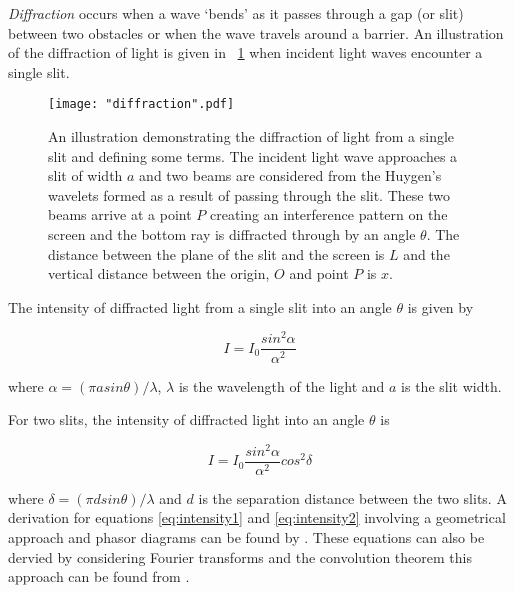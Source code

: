 \documentclass{article}
\newcommand{\figref}[2][\figurename~]{#1\ref{#2}}
\begin{document}
\vspace{2mm}
\noindent
\textit{Diffraction} occurs when a wave `bends' as it passes through a gap (or slit) between two obstacles or when the wave travels around a barrier. An illustration of the diffraction of light is given in \figref{fig:diffraction} when incident light waves encounter a single slit.

\begin{figure}[h]
\centering
\texttt{[image: "diffraction".pdf]}
\caption{An illustration demonstrating the diffraction of light from a single slit and defining some terms. The incident light wave approaches a slit of width $a$ and two beams are considered from the Huygen's wavelets \cite{Book01} formed as a result of passing through the slit. These two beams arrive at a point $P$ creating an interference pattern on the screen and the bottom ray is diffracted through by an angle $\theta$. The distance between the plane of the slit and the screen is $L$ and the vertical distance between the origin, $O$ and point $P$ is $x$. }
\label{fig:diffraction}
\end{figure}

\vspace{2mm}
\noindent
The intensity of diffracted light from a single slit into an angle $\theta$ \cite{Paper02} is given by

\begin{equation}
\label{eq:intensity1}
I = I_0 \frac{sin^2{\alpha}}{\alpha^2}
\end{equation}

\vspace{2mm}
\noindent
where $\alpha = ({\pi asin{\theta}}) / {\lambda}$, $\lambda$ is the wavelength of the light and $a$ is the slit width.

\vspace{2mm}
\noindent
For two slits, the intensity of diffracted light into an angle $\theta$ \cite{Paper02} is

\begin{equation}
\label{eq:intensity2}
I = I_0 \frac{sin^2{\alpha}}{\alpha^2} cos^2{\delta}
\end{equation}

\vspace{2mm}
\noindent
where $\delta = ({\pi dsin{\theta}}) / {\lambda}$ and $d$ is the separation distance between the two slits. A derivation for equations \eqref{eq:intensity1} and \eqref{eq:intensity2} involving a geometrical approach and phasor diagrams can be found by \cite{Book01}. These equations can also be dervied by considering Fourier transforms and the convolution theorem this approach can be found from \cite{Web02}.
\end{document}
